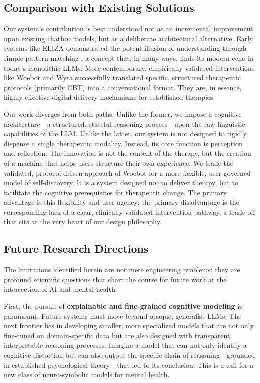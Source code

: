 \subsection{Comparison with Existing Solutions}

Our system's contribution is best understood not as an incremental improvement upon existing chatbot models, but as a deliberate architectural alternative. Early systems like ELIZA demonstrated the potent illusion of understanding through simple pattern matching \cite{weizenbaum1966}, a concept that, in many ways, finds its modern echo in today's monolithic LLMs. More contemporary, empirically-validated interventions like Woebot \cite{fitzpatrick2017} and Wysa \cite{inkster2018} successfully translated specific, structured therapeutic protocols (primarily CBT) into a conversational format. They are, in essence, highly effective digital delivery mechanisms for established therapies.

Our work diverges from both paths. Unlike the former, we impose a cognitive architecture—a structured, stateful reasoning process—upon the raw linguistic capabilities of the LLM. Unlike the latter, our system is not designed to rigidly dispense a single therapeutic modality. Instead, its core function is perception and reflection. The innovation is not the content of the therapy, but the creation of a machine that helps users structure their own experience. We trade the validated, protocol-driven approach of Woebot for a more flexible, user-governed model of self-discovery. It is a system designed not to deliver therapy, but to facilitate the cognitive prerequisites for therapeutic change. The primary advantage is this flexibility and user agency; the primary disadvantage is the corresponding lack of a clear, clinically validated intervention pathway, a trade-off that sits at the very heart of our design philosophy.

\subsection{Future Research Directions}

The limitations identified herein are not mere engineering problems; they are profound scientific questions that chart the course for future work at the intersection of AI and mental health.

First, the pursuit of \textbf{explainable and fine-grained cognitive modeling} is paramount. Future systems must move beyond opaque, generalist LLMs. The next frontier lies in developing smaller, more specialized models that are not only fine-tuned on domain-specific data but are also designed with transparent, interpretable reasoning processes. Imagine a model that can not only identify a cognitive distortion but can also output the specific chain of reasoning—grounded in established psychological theory—that led to its conclusion. This is a call for a new class of neuro-symbolic models for mental health.

